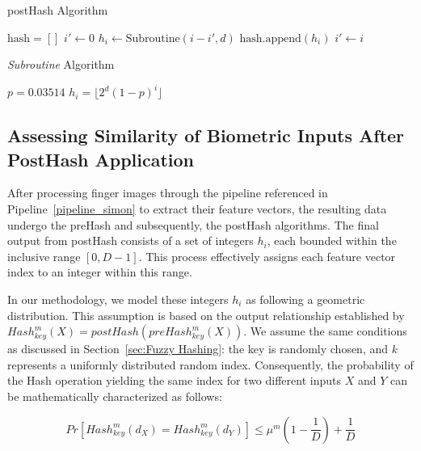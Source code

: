 \begin{algorithm}
    \begin{algorithmic}[1]
    \caption{postHash Algorithm}
    \label{postHash Algorithm}
    \State $\text{hash} = []$
    \State $i' \gets 0$
        \State $h_i \gets \text{Subroutine}(i - i', d)$
        \State $\text{hash.append}(h_i)$
        \State $i' \gets i$
    \EndFor 
    \State {}
    \EndFunction
    \end{algorithmic}
    \end{algorithm}
    
    \begin{algorithm}
    \begin{algorithmic}[1]
    \caption{\textit{Subroutine} Algorithm}
    \label{Subroutine Algorithm}
    \State $p = 0.03514$
    \State $h_i = \lfloor 2^d (1-p)^{i} \rfloor$
    \State {}
    \EndFunction
    \end{algorithmic}
    \end{algorithm}

\subsection{Assessing Similarity of Biometric Inputs After PostHash Application}
\label{sec:q}

After processing finger images through the pipeline referenced in Pipeline~\ref{pipeline_simon} to extract their feature vectors, the resulting data undergo the preHash and subsequently, the postHash algorithms. The final output from postHash consists of a set of integers \( h_i \), each bounded within the inclusive range \([0, D-1]\). This process effectively assigns each feature vector index to an integer within this range.

In our methodology, we model these integers \( h_i \) as following a geometric distribution. This assumption is based on the output relationship established by \( Hash_{key}^m(X) = postHash(preHash_{key}^m(X)) \). We assume the same conditions as discussed in Section~\ref{sec:Fuzzy Hashing}: the key is randomly chosen, and \(k\) represents a uniformly distributed random index. Consequently, the probability of the Hash operation yielding the same index for two different inputs \(X\) and \(Y\) can be mathematically characterized as follows:

\[Pr[Hash_{key}^m(d_X) = Hash_{key}^m(d_Y)] \leq \mu^m(1 - \frac{1}{D}) + \frac{1}{D}\]

